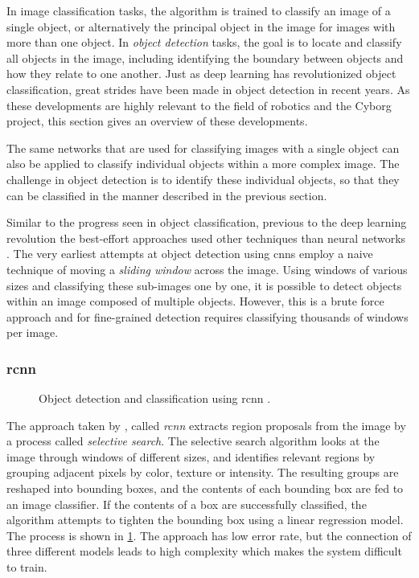 \documentclass[\rootfolder/main.tex]{subfiles}
\begin{document}
In image classification tasks, the algorithm is trained to classify an image of a single object, or alternatively the principal object in the image for images with more than one object.
In \emph{object detection} tasks, the goal is to locate and classify all objects in the image, including identifying the boundary between objects and how they relate to one another.
Just as deep learning has revolutionized object classification, great strides have been made in object detection in recent years.
As these developments are highly relevant to the field of robotics and the Cyborg project, this section gives an overview of these developments.

The same networks that are used for classifying images with a single object can also be applied to classify individual objects within a more complex image.
The challenge in object detection is to identify these individual objects, so that they can be classified in the manner described in the previous section.

Similar to the progress seen in object classification, previous to the deep learning revolution the best-effort approaches used other techniques than neural networks \cite{Girshick2013}.
The very earliest attempts at object detection using \acrshort{cnn}s employ a naive technique of moving a \emph{sliding window} across the image.
Using windows of various sizes and classifying these sub-images one by one, it is possible to detect objects within an image composed of multiple objects.
However, this is a brute force approach and for fine-grained detection requires classifying thousands of windows per image.

\subsubsection{\acrfull{rcnn}}

\begin{figure}
    \caption[Object detection and classification using \acrshort{rcnn}]{Object detection and classification using \acrshort{rcnn} \cite{Girshick2013}.\label{fig:r-cnn}}
\end{figure}

The approach taken by \cite{Girshick2013}, called \emph{\acrfull{rcnn}} extracts region proposals from the image by a process called \emph{selective search}.
The selective search algorithm looks at the image through windows of different sizes, and identifies relevant regions by grouping adjacent pixels by color, texture or intensity.
The resulting groups are reshaped into bounding boxes, and the contents of each bounding box are fed to an image classifier.
If the contents of a box are successfully classified, the algorithm attempts to tighten the bounding box using a linear regression model.
The process is shown in \cref{fig:r-cnn}.
The approach has low error rate, but the connection of three different models leads to high complexity which makes the system difficult to train.
\end{document}
